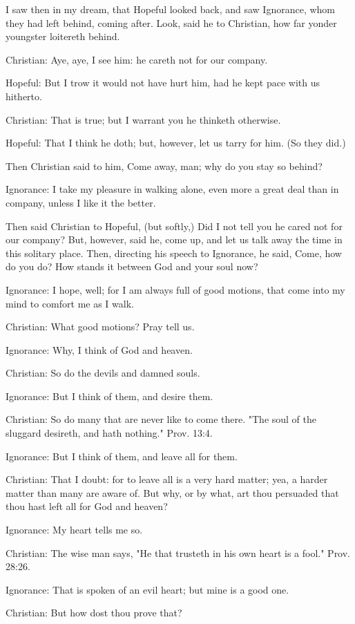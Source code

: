 I saw then in my dream, that Hopeful looked back, and saw Ignorance,
whom they had left behind, coming after. Look, said he to Christian,
how far yonder youngster loitereth behind.

Christian: Aye, aye, I see him: he careth not for our company.

Hopeful: But I trow it would not have hurt him, had he kept pace with
us hitherto.

Christian: That is true; but I warrant you he thinketh otherwise.

Hopeful: That I think he doth; but, however, let us tarry for him. (So
they did.)

Then Christian said to him, Come away, man; why do you stay so behind?

Ignorance: I take my pleasure in walking alone, even more a great deal
than in company, unless I like it the better.

Then said Christian to Hopeful, (but softly,) Did I not tell you he
cared not for our company? But, however, said he, come up, and let us
talk away the time in this solitary place. Then, directing his speech
to Ignorance, he said, Come, how do you do? How stands it between God
and your soul now?

Ignorance: I hope, well; for I am always full of good motions, that
come into my mind to comfort me as I walk.

Christian: What good motions? Pray tell us.

Ignorance: Why, I think of God and heaven.

Christian: So do the devils and damned souls.

Ignorance: But I think of them, and desire them.

Christian: So do many that are never like to come there. "The soul of
the sluggard desireth, and hath nothing." Prov. 13:4.

Ignorance: But I think of them, and leave all for them.

Christian: That I doubt: for to leave all is a very hard matter; yea, a
harder matter than many are aware of. But why, or by what, art thou
persuaded that thou hast left all for God and heaven?

Ignorance: My heart tells me so.

Christian: The wise man says, "He that trusteth in his own heart is a
fool." Prov. 28:26.

Ignorance: That is spoken of an evil heart; but mine is a good one.

Christian: But how dost thou prove that?

